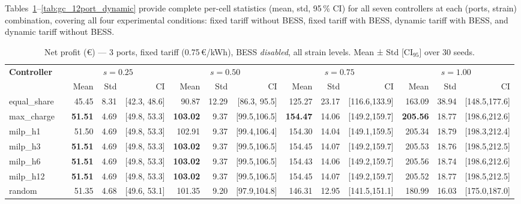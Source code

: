 Tables~\ref{tab:gc_3port_fixed_nobess}--\ref{tab:gc_12port_dynamic} provide
complete per-cell statistics (mean, std, 95\,\% CI) for all seven controllers
at each (ports, strain) combination, covering all four experimental conditions:
fixed tariff without BESS, fixed tariff with BESS, dynamic tariff with BESS,
and dynamic tariff without BESS.

\begin{table}[!htb]
\centering
\caption{Net profit (€) — 3 ports, fixed tariff (0.75\,€/kWh), BESS \emph{disabled},
         all strain levels. Mean ± Std [CI$_{95}$] over 30 seeds.}
\label{tab:gc_3port_fixed_nobess}
\setlength{\tabcolsep}{3pt}
\begin{tabular}{lp{1cm} rrr rrr rrr rrr}
\toprule
\textbf{Controller} & &
  \multicolumn{3}{c}{$s=0.25$} &
  \multicolumn{3}{c}{$s=0.50$} &
  \multicolumn{3}{c}{$s=0.75$} &
  \multicolumn{3}{c}{$s=1.00$} \\
\cmidrule(lr){3-5}\cmidrule(lr){6-8}\cmidrule(lr){9-11}\cmidrule(lr){12-14}
 & & Mean & Std & CI & Mean & Std & CI & Mean & Std & CI & Mean & Std & CI \\
\midrule
equal\_share & & 45.45 &  8.31 & [42.3, 48.6] &  90.87 & 12.29 & [86.3, 95.5] & 125.27 & 23.17 & [116.6,133.9] & 163.09 & 38.94 & [148.5,177.6] \\
max\_charge  & & \textbf{51.51} &  4.69 & [49.8, 53.3] & \textbf{103.02} &  9.37 & [99.5,106.5] & \textbf{154.47} & 14.06 & [149.2,159.7] & \textbf{205.56} & 18.77 & [198.6,212.6] \\
milp\_h1     & & 51.50 &  4.69 & [49.8, 53.3] & 102.91 &  9.37 & [99.4,106.4] & 154.30 & 14.04 & [149.1,159.5] & 205.34 & 18.79 & [198.3,212.4] \\
milp\_h3     & & \textbf{51.51} &  4.69 & [49.8, 53.3] & \textbf{103.02} &  9.37 & [99.5,106.5] & 154.45 & 14.07 & [149.2,159.7] & 205.53 & 18.76 & [198.5,212.5] \\
milp\_h6     & & \textbf{51.51} &  4.69 & [49.8, 53.3] & \textbf{103.02} &  9.37 & [99.5,106.5] & 154.43 & 14.06 & [149.2,159.7] & 205.56 & 18.74 & [198.6,212.6] \\
milp\_h12    & & \textbf{51.51} &  4.69 & [49.8, 53.3] & \textbf{103.02} &  9.37 & [99.5,106.5] & 154.45 & 14.07 & [149.2,159.7] & 205.52 & 18.77 & [198.5,212.5] \\
random       & & 51.35 &  4.68 & [49.6, 53.1] & 101.35 &  9.20 & [97.9,104.8] & 146.31 & 12.95 & [141.5,151.1] & 180.99 & 16.03 & [175.0,187.0] \\
\bottomrule
\end{tabular}
\end{table}


